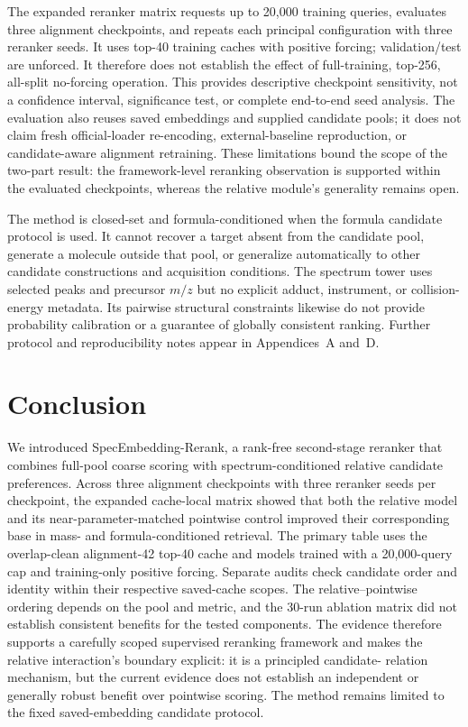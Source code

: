 \documentclass[runningheads]{llncs}
\newcommand{\method}{SpecEmbedding-Rerank}
\begin{document}
The expanded reranker matrix requests up to 20,000 training queries, evaluates
three alignment checkpoints, and repeats each principal configuration with
three reranker seeds. It uses top-40 training caches with positive forcing;
validation/test are unforced. It therefore does not establish the effect of
full-training, top-256, all-split no-forcing operation.
This provides descriptive checkpoint sensitivity, not a
confidence interval, significance test, or complete end-to-end seed analysis.
The evaluation also reuses saved embeddings and supplied candidate pools; it
does not claim fresh official-loader re-encoding, external-baseline
reproduction, or candidate-aware alignment retraining. These limitations bound
the scope of the two-part result: the framework-level reranking observation is
supported within the evaluated checkpoints, whereas the relative module's
generality remains open.

The method is closed-set and formula-conditioned when the formula candidate
protocol is used. It cannot recover a target absent from the candidate pool,
generate a molecule outside that pool, or generalize automatically to other
candidate constructions and acquisition conditions. The spectrum tower uses
selected peaks and precursor $m/z$ but no explicit adduct, instrument, or
collision-energy metadata. Its pairwise structural constraints likewise do not
provide probability calibration or a guarantee of globally consistent ranking.
Further protocol and reproducibility notes appear in Appendices~A and~D.

\section{Conclusion}

\begin{sloppypar}
We introduced \method{}, a rank-free second-stage reranker that
combines full-pool coarse scoring with spectrum-conditioned relative candidate
preferences. Across three alignment checkpoints with three reranker seeds per
checkpoint, the expanded cache-local matrix showed that both the relative model
and its near-parameter-matched pointwise control improved their corresponding
base in mass- and formula-conditioned retrieval. The primary table uses the
overlap-clean alignment-42 top-40 cache and models trained with a 20,000-query
cap and training-only positive forcing. Separate audits check candidate order
and identity within their respective saved-cache scopes.
The relative--pointwise ordering depends on the pool and metric, and the 30-run ablation matrix
did not establish consistent benefits for the tested components. The evidence therefore
supports a carefully scoped supervised reranking framework and makes the
relative interaction's boundary explicit: it is a principled candidate-
relation mechanism, but the current evidence does not establish an independent
or generally robust benefit over pointwise scoring. The method remains limited
to the fixed saved-embedding candidate protocol.
\end{sloppypar}
\end{document}
